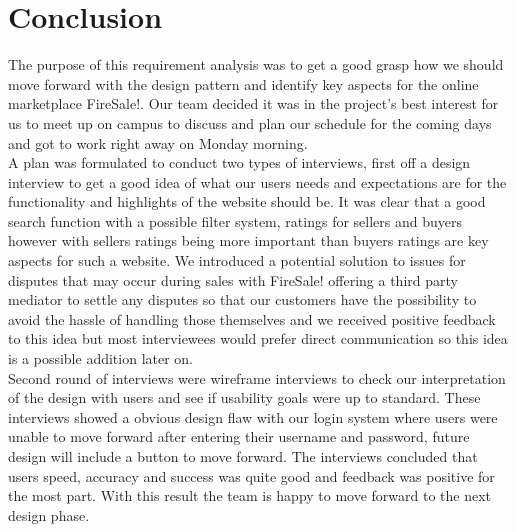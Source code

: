 \section{Conclusion}

The purpose of this requirement analysis was to get a good grasp how we should move forward with the design pattern and identify key aspects for the online marketplace FireSale!. Our team decided it was in the project's best interest for us to meet up on campus to discuss and plan our schedule for the coming days and got to work right away on Monday morning. \\


\noindent A plan was formulated to conduct two types of interviews, first off a design interview to get a good idea of what our users needs and expectations are for the functionality and highlights of the website should be. It was clear that a good search function with a possible filter system, ratings for sellers and buyers however with sellers ratings being more important than buyers ratings are key aspects for such a website. We introduced a potential solution to issues for disputes that may occur during sales with FireSale! offering a third party mediator to settle any disputes so that our customers have the possibility to avoid the hassle of handling those themselves and we received positive feedback to this idea but most interviewees would prefer direct communication so this idea is a possible addition later on.\\


\noindent Second round of interviews were wireframe interviews to check our interpretation of the design with users and see if usability goals were up to standard. These interviews showed a obvious design flaw with our login system where users were unable to move forward after entering their username and password, future design will include a button to move forward. The interviews concluded that users speed, accuracy and success was quite good and feedback was positive for the most part. With this result the team is happy to move forward to the next design phase. 